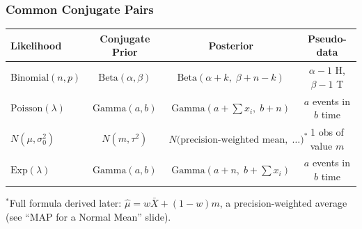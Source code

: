 \documentclass[aspectratio=169]{beamer}
\begin{document}
\begin{frame}
\frametitle{Common Conjugate Pairs}

\centering
\small
\renewcommand{\arraystretch}{1.5}
\begin{tabular}{@{}lccc@{}}
\hline
\textbf{Likelihood} & \textbf{Conjugate Prior} & \textbf{Posterior} & \textbf{Pseudo-data}\\
\hline
$\text{Binomial}(n,p)$ & $\text{Beta}(\alpha,\beta)$ & $\text{Beta}(\alpha{+}k,\;\beta{+}n{-}k)$ & $\alpha{-}1$ H, $\beta{-}1$ T\\
$\text{Poisson}(\lambda)$ & $\text{Gamma}(a,b)$ & $\text{Gamma}(a{+}\sum x_i,\; b{+}n)$ & $a$ events in $b$ time\\
$N(\mu,\sigma_0^2)$ & $N(m, \tau^2)$ & $N\!\big(\text{precision-weighted mean},\;\ldots\big)^{*}$ & 1 obs of value $m$\\
$\text{Exp}(\lambda)$ & $\text{Gamma}(a,b)$ & $\text{Gamma}(a{+}n,\; b{+}\sum x_i)$ & $a$ events in $b$ time\\
\hline
\end{tabular}

\vspace{0.1cm}
{\footnotesize ${}^{*}$Full formula derived later: $\hat\mu = w\bar{X} + (1{-}w)m$, a precision-weighted average (see ``MAP for a Normal Mean'' slide).}

\vspace{0.2cm}
\begin{center}
\end{center}
\end{frame}
\end{document}
